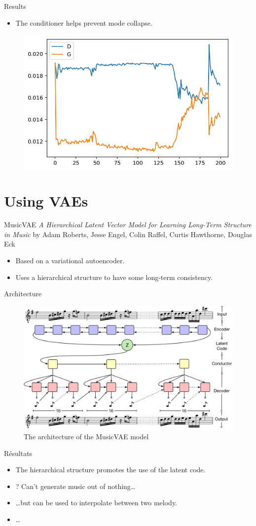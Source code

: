 \documentclass{beamer}
\begin{document}
\begin{frame}{Results}
\begin{itemize}
	\item The conditioner helps prevent mode collapse.
\end{itemize}
\begin{figure}[h]
\centering
\includegraphics[width=0.6\linewidth]{loss_midinet_w_cond}
\end{figure}
\end{frame}

\section{Using VAEs}
\begin{frame}{MusicVAE}
\textit{A Hierarchical Latent Vector Model for Learning Long-Term Structure in Music}
by Adam Roberts, Jesse Engel, Colin Raffel, Curtis Hawthorne, Douglas Eck
\begin{itemize}
	\item Based on a variational autoencoder.
	\item Uses a hierarchical structure to have some long-term consistency.
\end{itemize}
\end{frame}

\begin{frame}{Architecture}
\begin{figure}[h]
\centering
\includegraphics[width=\linewidth]{musicVAE}
\caption{The architecture of the MusicVAE model}
\end{figure}
\end{frame}

\begin{frame}{Résultats}
\begin{itemize}
	\item The hierarchical structure promotes the use of the latent code.
	\item ? Can't generate music out of nothing\dots
	\item \dots but can be used to interpolate between two melody.
	\item \dots
\end{itemize}
\end{frame}
\end{document}
